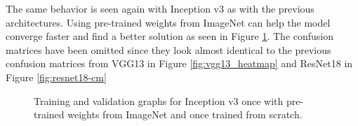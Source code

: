 \begin{table}[!h] \centering
{}
\caption{Hyper parameters for Inception v3 optimized with SigOpt. First row shows hyper parameters training the architecture from scratch. Second row used pre-trained weights from ImageNet}
\label{tbl:Inceptionv3_overview}
\end{table}

The same behavior is seen again with Inception v3 as with the previous architectures. Using pre-trained weights from ImageNet can help the model converge faster and find a better solution as seen in Figure \ref{fig:inception-graph}. The confusion matrices have been omitted since they look almost identical to the previous confusion matrices from VGG13 in Figure \ref{fig:vgg13_heatmap} and ResNet18 in Figure \ref{fig:resnet18-cm} \\


\begin{figure}[!h]
\centering
\caption{Training and validation graphs for Inception v3 once with pre-trained weights from ImageNet and once trained from scratch.}
\label{fig:inception-graph}
\end{figure}

